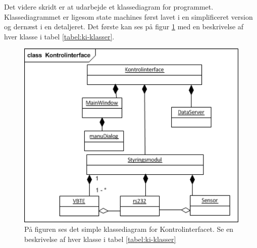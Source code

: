 Det videre skridt er at udarbejde et klassediagram for programmet. Klassediagrammet er ligesom state machines først lavet i en simplificeret version og dernæst i en detaljeret. Det første kan ses på figur \ref{fig:kd_simpel} med en beskrivelse af hver klasse i tabel \ref{tabel:ki-klasser}.\\

\begin{figure}[htbp]
\centering
\label{fig:kd_simpel}
\includegraphics[width=1\textwidth]{billeder/KI/klassediagram_simpel}
\caption{På figuren ses det simple klassediagram for Kontrolinterfacet. Se en beskrivelse af hver klasse i tabel \ref{tabel:ki-klasser}}
\end{figure}
 
